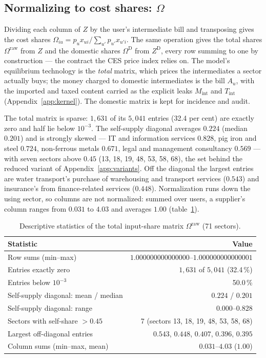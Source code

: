 \subsection{Normalizing to cost shares: $\Omega$}\label{app:pipeline-omega}

Dividing each column of $Z$ by the user's intermediate bill and transposing
gives the cost shares $\Omega_{iu}=p_ux_{ui}/\sum_{u'}p_{u'}x_{u'i}$. The same operation
gives the total shares $\Omega^{\mathrm{raw}}$ from $Z$ and the domestic shares
$\Omega^{\mathrm{D}}$ from $Z^{\mathrm{D}}$, every row summing to one by
construction --- the contract the CES price index relies on. The model's
equilibrium technology is the \emph{total} matrix, which prices the intermediates
a sector actually buys; the money charged to domestic intermediates is the bill $A_u$,
with the imported and taxed content carried as the explicit leaks
$M_{\mathrm{int}}$ and $T_{\mathrm{int}}$ (Appendix~\ref{app:kernel}). The
domestic matrix is kept for incidence and audit.

The total matrix is sparse: $1{,}631$ of its
$5{,}041$ entries (32.4 per cent) are exactly zero and half lie below $10^{-3}$.
The self-supply diagonal averages $0.224$ (median $0.201$) and is strongly
skewed --- IT and information services $0.828$, pig iron and steel $0.724$,
non-ferrous metals $0.671$, legal and management consultancy $0.569$ --- with
seven sectors above $0.45$ (13, 18, 19, 48, 53, 58, 68), the set behind the
reduced variant of Appendix~\ref{app:variants}. Off the diagonal the largest
entries are water transport's purchase of warehousing and transport services
($0.543$) and insurance's from finance-related services ($0.448$). Normalization
runs down the using sector, so
columns are not normalized: summed over users, a supplier's column ranges from
$0.031$ to $4.03$ and averages $1.00$ (table~\ref{tab:pipeline-omega}).

\begin{table}[t]
\centering
\caption{Descriptive statistics of the total input-share matrix $\Omega^{\mathrm{raw}}$ (71 sectors).}
\label{tab:pipeline-omega}
\small
\begin{tabular}{lr}
\toprule
Statistic & Value \\
\midrule
Row sums (min--max) & $1.000000000000000$--$1.000000000000001$ \\
Entries exactly zero & $1{,}631$ of $5{,}041$ (32.4\,\%) \\
Entries below $10^{-3}$ & 50.0\,\% \\
Self-supply diagonal: mean / median & $0.224$ / $0.201$ \\
Self-supply diagonal: range & $0.000$--$0.828$ \\
Sectors with self-share $>0.45$ & 7 (sectors 13, 18, 19, 48, 53, 58, 68) \\
Largest off-diagonal entries & $0.543$, $0.448$, $0.407$, $0.396$, $0.395$ \\
Column sums (min--max, mean) & $0.031$--$4.03$ ($1.00$) \\
\bottomrule
\end{tabular}
\end{table}

